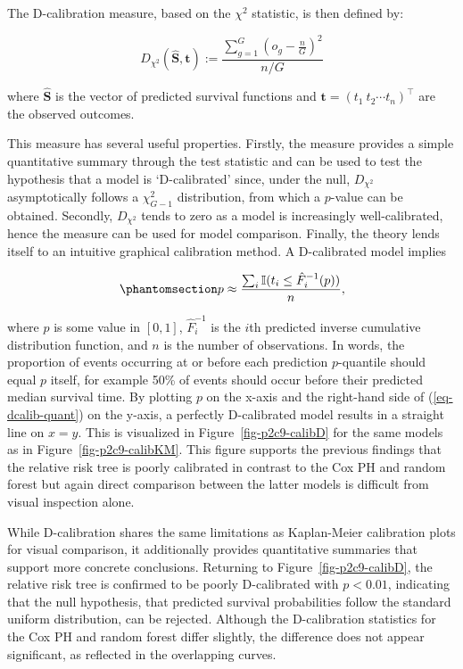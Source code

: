 \documentclass[
  letterpaper,
  krantz2]{style/krantz}
\begin{document}
The D-calibration measure, based on the \(\chi^2\) statistic, is then
defined by:

\[
D_{\chi^2}(\hat{\mathbf{S}}, \mathbf{t}) :=  \frac{\sum^G_{g = 1} (o_g - \frac{n}{G})^2}{n/G}
\]

where \(\hat{\mathbf{S}}\) is the vector of predicted survival functions
and \(\boldsymbol{\mathbf{t}} = ({t}_1 \ {t}_2 \cdots {t}_{n})^\top\)
are the observed outcomes.

This measure has several useful properties. Firstly, the measure
provides a simple quantitative summary through the test statistic and
can be used to test the hypothesis that a model is `D-calibrated' since,
under the null, \(D_{\chi^2}\) asymptotically follows a \(\chi^2_{G-1}\)
distribution, from which a \(p\)-value can be obtained. Secondly,
\(D_{\chi^2}\) tends to zero as a model is increasingly well-calibrated,
hence the measure can be used for model comparison. Finally, the theory
lends itself to an intuitive graphical calibration
method. A D-calibrated model implies

\begin{equation}\phantomsection\label{eq-dcalib-quant}{
p \approx \frac{\sum_i \mathbb{I}(t_i \leq \hat{F}_i^{-1}(p))}{n},
}\end{equation}

where \(p\) is some value in \([0,1]\), \(\hat{F}_i^{-1}\) is the
\(i\)th predicted inverse cumulative distribution function, and \(n\) is
the number of observations. In words, the proportion of events occurring
at or before each prediction \(p\)-quantile should equal \(p\) itself,
for example 50\% of events should occur before their predicted median
survival time. By plotting \(p\) on the x-axis and the right-hand side
of (\ref{eq-dcalib-quant}) on the y-axis, a perfectly D-calibrated model
results in a straight line on \(x = y\). This is visualized in
Figure~\ref{fig-p2c9-calibD} for the same models as in
Figure~\ref{fig-p2c9-calibKM}. This figure supports the previous
findings that the relative risk tree is poorly calibrated in contrast to
the Cox PH and random forest but again direct comparison between the
latter models is difficult from visual inspection alone.

While D-calibration shares the same limitations as Kaplan-Meier
calibration plots for visual comparison, it additionally provides
quantitative summaries that support more concrete conclusions. Returning
to Figure~\ref{fig-p2c9-calibD}, the relative risk tree is confirmed to
be poorly D-calibrated with \(p<0.01\), indicating that the null
hypothesis, that predicted survival probabilities follow the standard
uniform distribution, can be rejected. Although the D-calibration
statistics for the Cox PH and random forest differ slightly, the
difference does not appear significant, as reflected in the overlapping
curves.
\end{document}
